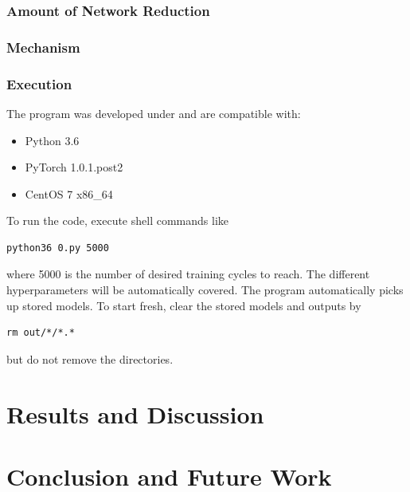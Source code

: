 \documentclass[runningheads]{llncs}
\begin{document}
\subsubsection{Amount of Network Reduction}

\subsubsection{Mechanism} 

\subsubsection{Execution}

The program was developed under and are compatible with:
\begin{itemize}
\item Python 3.6
\item PyTorch 1.0.1.post2
\item CentOS 7 x86\_64
\end{itemize}
To run the code, execute shell commands like
\begin{verbatim}
python36 0.py 5000
\end{verbatim}
where 5000 is the number of desired training cycles to reach.
The different hyperparameters will be automatically covered.
The program automatically picks up stored models.
To start fresh, clear the stored models and outputs by
\begin{verbatim}
rm out/*/*.*
\end{verbatim}
but do not remove the directories.


\section{Results and Discussion}

\section{Conclusion and Future Work}
\end{document}
